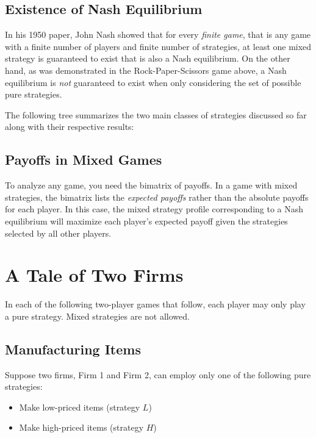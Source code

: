\documentclass[twoside]{article}
\begin{document}
\subsection{Existence of Nash Equilibrium}
In his 1950 paper, John Nash showed that for every \textit{finite game}, that is any game with a finite number of players and finite number of strategies, at least one mixed strategy is guaranteed to exist that is also a Nash equilibrium. On the other hand, as was demonstrated in the Rock-Paper-Scissors game above, a Nash equilibrium is \textit{not} guaranteed to exist when only considering the set of possible pure strategies.

The following tree summarizes the two main classes of strategies discussed so far along with their respective results:


\subsection{Payoffs in Mixed Games}
To analyze any game, you need the bimatrix of payoffs. In a game with mixed strategies, the bimatrix lists the \textit{expected payoffs} rather than the absolute payoffs for each player. In this case, the mixed strategy profile corresponding to a Nash equilibrium will maximize each player's expected payoff given the strategies selected by all other players.

\section{A Tale of Two Firms}
In each of the following two-player games that follow, each player may only play a pure strategy. Mixed strategies are not allowed.

\subsection{Manufacturing Items}
Suppose two firms, Firm 1 and Firm 2, can employ only one of the following pure strategies:

\begin{itemize}
    \item Make low-priced items (strategy $L$)
    \item Make high-priced items (strategy $H$)
\end{itemize}
\end{document}
